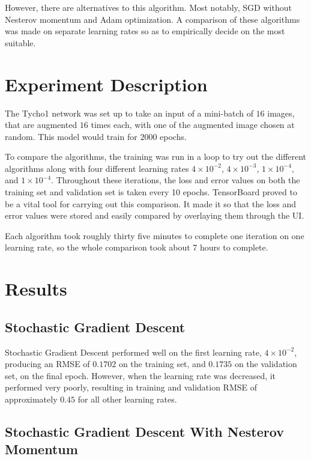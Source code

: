 \documentclass[12pt,a4paper,oneside,oldfontcommands]{memoir}
\begin{document}
\begin{Declaration Of OriginalityOrginality}
However, there are alternatives to this algorithm. Most notably, SGD without Nesterov momentum and Adam optimization. A comparison of these algorithms was made on separate learning rates so as to empirically decide on the most suitable.

\section{Experiment Description}

The Tycho1 network was set up to take an input of a mini-batch of \(16\) images, that are augmented \(16\) times each, with one of the augmented image chosen at random. This model would train for \(2000\) epochs.

To compare the algorithms, the training was run in a loop to try out the different algorithms along with four different learning rates \(4\times10^{-2}\), \(4\times10^{-3}\), \(1\times10^{-4}\), and \(1\times10^{-4}\). Throughout these iterations, the loss and error values on both the training set and validation set is taken every 10 epochs. TensorBoard proved to be a vital tool for carrying out this comparison. It made it so that the loss and error values were stored and easily compared by overlaying them through the UI.

Each algorithm took roughly thirty five minutes to complete one iteration on one learning rate, so the whole comparison took about 7 hours to complete.

\section{Results}

\subsection{Stochastic Gradient Descent}

Stochastic Gradient Descent performed well on the first learning rate, \(4\times10^{-2}\), producing an RMSE of \(0.1702\) on the training set, and \(0.1735\) on the validation set, on the final epoch. However, when the learning rate was decreased, it performed very poorly, resulting in training and validation RMSE of approximately \(0.45\) for all other learning rates.

\subsection{Stochastic Gradient Descent With Nesterov Momentum}


\end{Declaration Of OriginalityOrginality}
\end{document}
